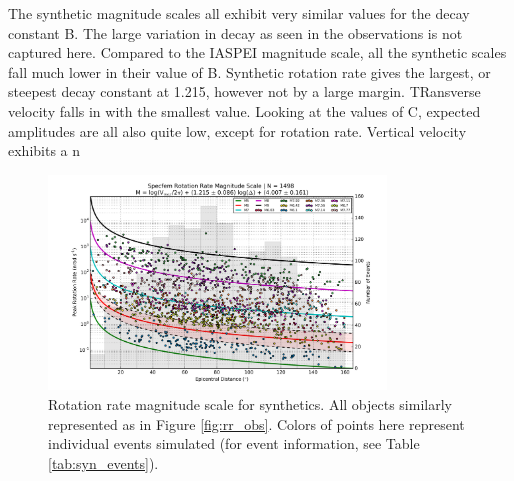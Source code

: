 \documentclass{gji}
\begin{document}
The synthetic magnitude scales all exhibit very similar values for the decay constant B. The large variation in decay as seen in the observations is not captured here. Compared to the IASPEI magnitude scale, all the synthetic scales fall much lower in their value of B. Synthetic rotation rate gives the largest, or steepest decay constant at 1.215, however not by a large margin. TRansverse velocity falls in with the smallest value. Looking at the values of C, expected amplitudes are all also quite low, except for rotation rate. Vertical velocity exhibits a n

\begin{figure}
\centerline{\includegraphics[width=0.8\textwidth]{rr_syn}}
\caption{Rotation rate magnitude scale for synthetics. All objects similarly represented as in Figure \ref{fig:rr_obs}. Colors of points here represent individual events simulated (for event information, see Table \ref{tab:syn_events}).}
\label{fig:syn_scale}
\end{figure}
\end{document}

